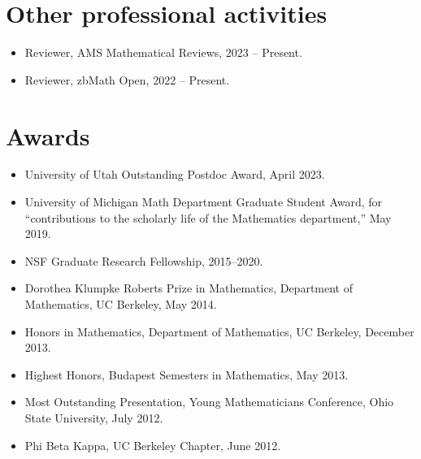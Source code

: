 \documentclass{res}
\begin{document}
\begin{resume}
\section{Other professional activities}
\begin{itemize}
\item Reviewer, AMS Mathematical Reviews, 2023 -- Present.
\item Reviewer, zbMath Open, 2022 -- Present.
\end{itemize}

\section{Awards}
\begin{itemize}
\item University of Utah Outstanding Postdoc Award, April 2023.
\item University of Michigan Math Department Graduate Student Award, for “contributions to the scholarly life of the Mathematics department,” May 2019.
\item NSF Graduate Research Fellowship, 2015–2020.
\item Dorothea Klumpke Roberts Prize in Mathematics, Department of Mathematics, UC Berkeley, May 2014.
\item Honors in Mathematics, Department of Mathematics, UC Berkeley, December 2013.
\item Highest Honors, Budapest Semesters in Mathematics, May 2013.
\item Most Outstanding Presentation, Young Mathematicians Conference, Ohio State University, July 2012.
\item Phi Beta Kappa, UC Berkeley Chapter, June 2012.
\end{itemize}
\end{resume}
\end{document}
